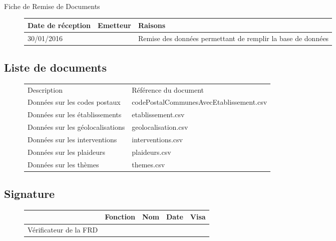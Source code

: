 \documentclass[asi, sansVersion]{picINSA}
\begin{document}
\begin{center}
\huge
\nomEquipe{}\\
Fiche de Remise de Documents\\
\end{center}
\vspace{0.5cm}


\begin{figure}[H]
		\centering
		\begin{tabularx}{17cm}{|p{4cm}|X|X|}
		\hline
		\rowcolor[gray]{0.85}Date de réception & Emetteur & Raisons \\
		\hline
		30/01/2016 & \nomClient{} & Remise des données permettant de remplir la base de données\\
		\hline
		\end{tabularx}
\end{figure}

\subsection*{Liste de documents}

\begin{figure}[H]
		\centering
		\begin{tabularx}{17cm}{|p{7cm}|X|}
		\hline
		\rowcolor[gray]{0.85} Description & Référence du document \\
		Données sur les codes postaux & codePostalCommunesAvecEtablissement.csv \\
		\hline
		Données sur les établissements & etablissement.csv\\
		\hline
		Données sur les géolocalisations & geolocalisation.csv\\
		\hline
		Données sur les interventions & interventions.csv\\
		\hline
		Données sur les plaideurs & plaideurs.csv\\
		\hline
		Données sur les thèmes & themes.csv\\
		\hline
		\end{tabularx}
\end{figure}

\subsection*{Signature}

\begin{figure}[H]
		\centering
		\begin{tabularx}{17cm}{|p{4cm}|X|X|X|X|}
		\hline
		\rowcolor[gray]{0.85}& Fonction & Nom & Date & Visa \\
		\hline
		 Vérificateur de la FRD & \RGC & \Mathieu &  &  \\
		\hline
		\end{tabularx}
\end{figure}
\end{document}
